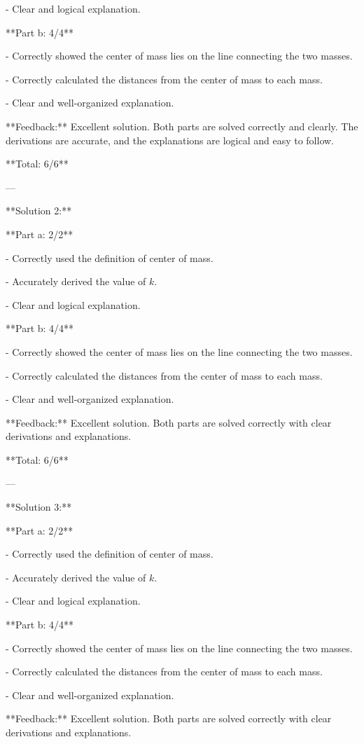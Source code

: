 \documentclass[a4paper,11pt]{article}
\begin{document}
- Clear and logical explanation.

**Part b: 4/4**

- Correctly showed the center of mass lies on the line connecting the two masses.

- Correctly calculated the distances from the center of mass to each mass.

- Clear and well-organized explanation.

**Feedback:** Excellent solution. Both parts are solved correctly and clearly. The derivations are accurate, and the explanations are logical and easy to follow.

**Total: 6/6**

---

**Solution 2:**

**Part a: 2/2**

- Correctly used the definition of center of mass.

- Accurately derived the value of \( k \).

- Clear and logical explanation.

**Part b: 4/4**

- Correctly showed the center of mass lies on the line connecting the two masses.

- Correctly calculated the distances from the center of mass to each mass.

- Clear and well-organized explanation.

**Feedback:** Excellent solution. Both parts are solved correctly with clear derivations and explanations.

**Total: 6/6**

---

**Solution 3:**

**Part a: 2/2**

- Correctly used the definition of center of mass.

- Accurately derived the value of \( k \).

- Clear and logical explanation.

**Part b: 4/4**

- Correctly showed the center of mass lies on the line connecting the two masses.

- Correctly calculated the distances from the center of mass to each mass.

- Clear and well-organized explanation.

**Feedback:** Excellent solution. Both parts are solved correctly with clear derivations and explanations.
\end{document}
